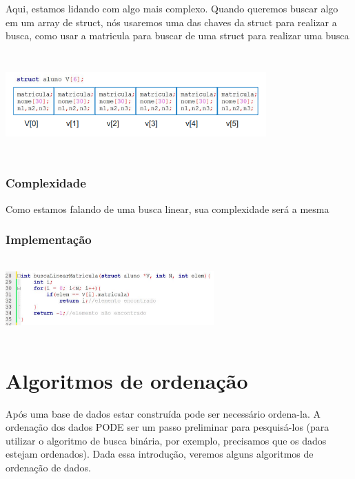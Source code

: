 \documentclass{report}
\begin{document}
	Aqui, estamos lidando com algo mais complexo. Quando queremos buscar algo em um array de struct, nós usaremos uma das chaves da struct para realizar a busca, como usar a matricula para buscar de uma struct para realizar uma busca
	
	\begin{center}
		
		\includegraphics[width=10cm,height=4cm,keepaspectratio=false]{imagens/bstruct.png}
		
	\end{center}
	
	\subsubsection{Complexidade}
	
	Como estamos falando de uma busca linear, sua complexidade será a mesma
	
	\subsubsection{Implementação}
	
	\begin{center}
		
		\includegraphics[width=8cm,height=3cm,keepaspectratio=false]{imagens/bstructimplement.png}
		
	\end{center}
	
	
	
	\section{Algoritmos de ordenação}
	Após uma base de dados estar construída pode ser necessário ordena-la. A ordenação dos dados PODE ser um passo preliminar para pesquisá-los (para utilizar o algoritmo de busca binária, por exemplo, precisamos que os dados estejam ordenados). Dada essa introdução, veremos alguns algoritmos de ordenação de dados.
	
\end{document}
